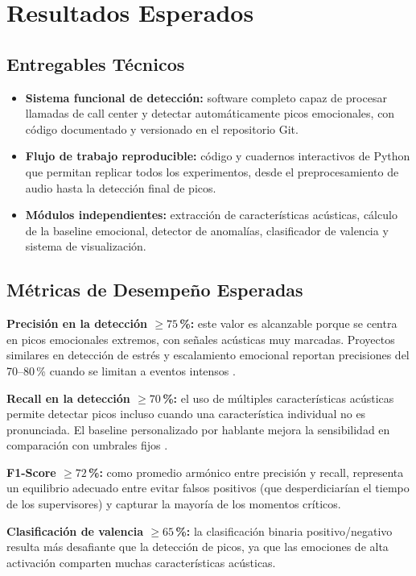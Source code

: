\section{Resultados Esperados}
\label{sec:resultados_esperados}

\subsection{Entregables Técnicos}

\begin{itemize}
    \item \textbf{Sistema funcional de detección:} software completo capaz de procesar
          llamadas de call center y detectar automáticamente picos emocionales, con
          código documentado y versionado en el repositorio Git.
    \item \textbf{Flujo de trabajo reproducible:} código y cuadernos interactivos de
          Python que permitan replicar todos los experimentos, desde el
          preprocesamiento de audio hasta la detección final de picos.
    \item \textbf{Módulos independientes:} extracción de características acústicas,
          cálculo de la baseline emocional, detector de anomalías, clasificador de
          valencia y sistema de visualización.
\end{itemize}

\subsection{Métricas de Desempeño Esperadas}

\textbf{Precisión en la detección $\geq 75$\,\%:} este valor es alcanzable porque se
centra en picos emocionales extremos, con señales acústicas muy marcadas. Proyectos
similares en detección de estrés y escalamiento emocional reportan precisiones del
70--80\,\% cuando se limitan a eventos intensos \cite{abdelhamid2022, wagner2023}.

\textbf{Recall en la detección $\geq 70$\,\%:} el uso de múltiples características
acústicas permite detectar picos incluso cuando una característica individual no es
pronunciada. El baseline personalizado por hablante mejora la sensibilidad en
comparación con umbrales fijos \cite{jha2022, gat2022}.

\textbf{F1-Score $\geq 72$\,\%:} como promedio armónico entre precisión y recall,
representa un equilibrio adecuado entre evitar falsos positivos (que desperdiciarían
el tiempo de los supervisores) y capturar la mayoría de los momentos críticos.

\textbf{Clasificación de valencia $\geq 65$\,\%:} la clasificación binaria
positivo/negativo resulta más desafiante que la detección de picos, ya que las
emociones de alta activación comparten muchas características acústicas.

